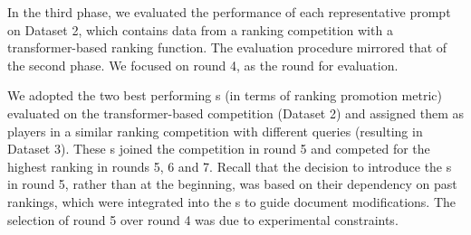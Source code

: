 In the third phase, we evaluated the performance of each representative prompt on Dataset 2, which contains data from a ranking competition with a transformer-based ranking function. The evaluation procedure mirrored that of the second phase. We focused on round 4, as the round for evaluation.

We adopted the two best performing \bt s (in terms of ranking promotion metric) evaluated on the transformer-based competition (Dataset 2) and assigned them as players in a similar ranking competition with different queries (resulting in Dataset 3). These \bt s joined the competition in round 5 and competed for the highest ranking in rounds 5, 6 and 7. Recall that the decision to introduce the \bt s in round 5, rather than at the beginning, was based on their dependency on past rankings, which were integrated into the \contextualized s to guide document modifications. The selection of round 5 over round 4 was due to experimental constraints.





